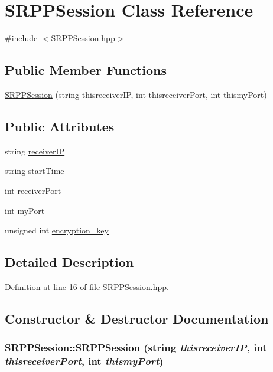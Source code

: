\hypertarget{class_s_r_p_p_session}{
\section{SRPPSession Class Reference}
\label{class_s_r_p_p_session}
}


{\ttfamily \#include $<$SRPPSession.hpp$>$}

\subsection*{Public Member Functions}
\begin{DoxyCompactItemize}
\item 
\hyperlink{class_s_r_p_p_session_a1586949ab645c8b4e0eefff4eeb8da1b}{SRPPSession} (string thisreceiverIP, int thisreceiverPort, int thismyPort)
\end{DoxyCompactItemize}
\subsection*{Public Attributes}
\begin{DoxyCompactItemize}
\item 
string \hyperlink{class_s_r_p_p_session_a559c805c8fa73759708828a3dc96b9f7}{receiverIP}
\item 
string \hyperlink{class_s_r_p_p_session_aae9df6b95bbcba60df75ac36f377218c}{startTime}
\item 
int \hyperlink{class_s_r_p_p_session_ae6981a0780fccbb981b3dc70a4e0d42b}{receiverPort}
\item 
int \hyperlink{class_s_r_p_p_session_a8c5abdbb98a0bf50b674407b88fa7756}{myPort}
\item 
unsigned int \hyperlink{class_s_r_p_p_session_aa1308daad577ca6664ce070e7e79272b}{encryption\_\-key}
\end{DoxyCompactItemize}


\subsection{Detailed Description}


Definition at line 16 of file SRPPSession.hpp.



\subsection{Constructor \& Destructor Documentation}
\hypertarget{class_s_r_p_p_session_a1586949ab645c8b4e0eefff4eeb8da1b}{
\subsubsection[{SRPPSession}]{\setlength{\rightskip}{0pt plus 5cm}SRPPSession::SRPPSession (string {\em thisreceiverIP}, \/  int {\em thisreceiverPort}, \/  int {\em thismyPort})}}
\label{class_s_r_p_p_session_a1586949ab645c8b4e0eefff4eeb8da1b}


